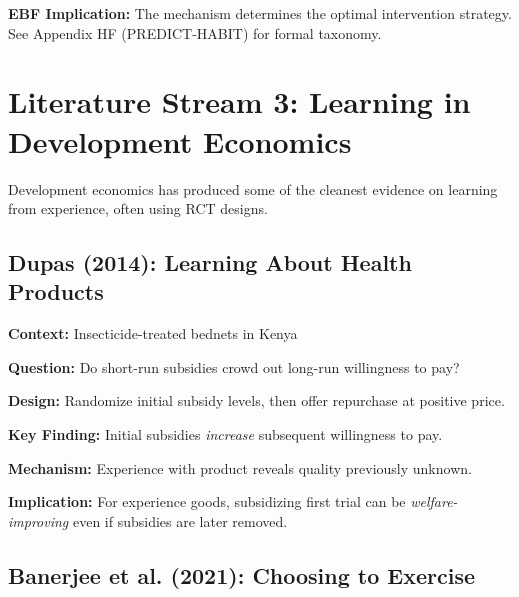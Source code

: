\documentclass[11pt, a4paper]{article}
\begin{document}
\textbf{EBF Implication:} The mechanism determines the optimal intervention strategy. See Appendix HF (PREDICT-HABIT) for formal taxonomy.


\section{Literature Stream 3: Learning in Development Economics}
\label{sec:lrn-development}

Development economics has produced some of the cleanest evidence on learning from experience, often using RCT designs.

\subsection{Dupas (2014): Learning About Health Products}

\begin{tcolorbox}[colback=gray!5!white, colframe=gray!75!black,
    title=Dupas (2014): Short-Run Subsidies and Long-Run Adoption]

\textbf{Context:} Insecticide-treated bednets in Kenya

\textbf{Question:} Do short-run subsidies crowd out long-run willingness to pay?

\textbf{Design:} Randomize initial subsidy levels, then offer repurchase at positive price.

\textbf{Key Finding:} Initial subsidies \textit{increase} subsequent willingness to pay.

\textbf{Mechanism:} Experience with product reveals quality previously unknown.

\textbf{Implication:} For experience goods, subsidizing first trial can be \textit{welfare-improving} even if subsidies are later removed.

\end{tcolorbox}

\subsection{Banerjee et al. (2021): Choosing to Exercise}
\end{document}
